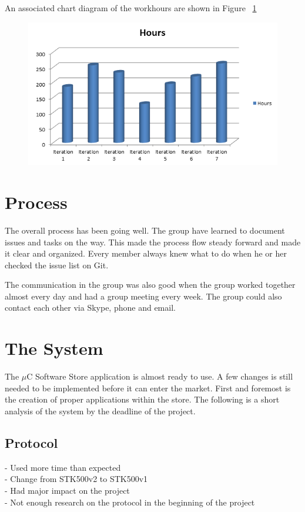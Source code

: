 	An associated chart diagram of the workhours are shown in Figure ~\ref{fig:workhours}

	\begin{figure}[H]
	\centering
	\label{fig:workhours}
	\includegraphics[scale=0.8]{images/workhours_chart2.png}
	\end{figure}

	\section{Process}
	The overall process has been going well. The group have learned to document issues and tasks on the way. This made the process flow steady forward and made it clear and organized. Every member always knew what to do when he or her checked the issue list on Git.

	The communication in the group was also good when the group worked together almost every day and had a group meeting every week. The group could also contact each other via Skype, phone and email.

	\section{The System}
	The $\mu$C Software Store application is almost ready to use. A few changes is still needed to be implemented before it can enter the market. First and foremost is the creation of proper applications within the store. The following is a short analysis of the system by the deadline of the project.\\


		\subsection{Protocol}
			- Used more time than expected\\
			- Change from STK500v2 to STK500v1\\
			- Had major impact on the project\\
			- Not enough research on the protocol in the beginning of the project\\

